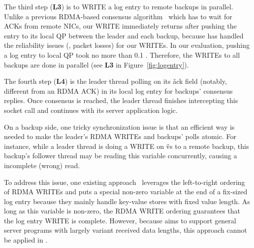 The third step (\textbf{L3}) is to WRITE a log entry to remote backups 
in parallel. Unlike a previous RDMA-based consensus 
algorithm~\cite{dare:hpdc15} which has to wait for ACKs from remote NICs, our 
WRITE immediately returns after pushing the entry to its local QP between the 
leader and each backup, because \paxos has handled the reliability issues (\eg, 
packet losses) for our WRITEs. In our evaluation, pushing a log entry to local 
QP took no more than 0.1 \us. Therefore, the WRITEs to all backups are done in 
parallel (see \textbf{L3} in Figure~\ref{fig:logentry}).


The fourth step (\textbf{L4}) is the leader thread polling on its \v{ack} 
field (notably, different from an RDMA ACK) in its local log entry for backups' 
consensus replies. Once consensus is reached, the leader thread finishes 
intercepting this \recv socket call and continues with its server application 
logic.

% 


On a backup side, one tricky synchronization issue is that an efficient way is 
needed to make the leader's RDMA WRITEs and backups' polls atomic. For instance, 
while a leader thread is doing a WRITE on \v{vs} to a remote backup, this 
backup's follower thread may be reading this variable concurrently, causing a 
incomplete (wrong) read.

To address this issue, one existing approach~\cite{farm:nsdi14,herd:sigcomm14} 
leverages the left-to-right ordering of RDMA WRITEs and puts a special 
non-zero variable at the end of a fix-sized log entry because they mainly 
handle key-value stores with fixed value length. As long as this variable is 
non-zero, the RDMA WRITE ordering guarantees that the log entry WRITE is 
complete. However, because \xxx aims to support general server programs with 
largely variant received data lengths, this approach cannot be applied in \xxx.

